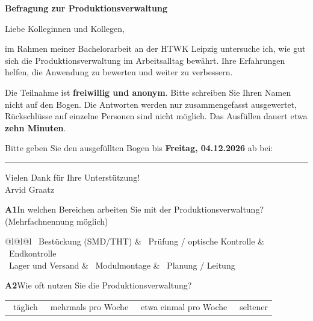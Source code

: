 \documentclass[11pt,a4paper]{article}
\newcommand{\kasten}{\raisebox{-0.2ex}{\scalebox{1.5}{$\square$}}}
\newcommand{\teil}[1]{\par\vspace{0.5em}{\large\bfseries #1}\par}
\begin{document}
{\LARGE\bfseries Befragung zur Produktionsverwaltung}

\vspace{0.3em}
Liebe Kolleginnen und Kollegen,

im Rahmen meiner Bachelorarbeit an der HTWK Leipzig untersuche ich, wie gut sich die
Produktionsverwaltung im Arbeitsalltag bewährt. Ihre Erfahrungen helfen, die Anwendung zu
bewerten und weiter zu verbessern.

Die Teilnahme ist \textbf{freiwillig und anonym}. Bitte schreiben Sie Ihren Namen nicht auf den
Bogen. Die Antworten werden nur zusammengefasst ausgewertet, Rückschlüsse auf einzelne Personen
sind nicht möglich. Das Ausfüllen dauert etwa \textbf{zehn Minuten}.

Bitte geben Sie den ausgefüllten Bogen bis \textbf{Freitag, 04.12.2026} ab bei:
\rule{5.2cm}{0.4pt}

Vielen Dank für Ihre Unterstützung!\\
Arvid Graatz

\teil{Teil A: Ihre Tätigkeit}

\textbf{A1}\enspace In welchen Bereichen arbeiten Sie mit der Produktionsverwaltung?
(Mehrfachnennung möglich)

\begin{tabular}{@{\hspace{1.8em}}l@{\hspace{2em}}l@{\hspace{2em}}l}
	\kasten\ Bestückung (SMD/THT) & \kasten\ Prüfung / optische Kontrolle & \kasten\ Endkontrolle \\[0.35em]
	\kasten\ Lager und Versand    & \kasten\ Modulmontage                 & \kasten\ Planung / Leitung \\[0.35em]
	\multicolumn{3}{@{\hspace{1.8em}}l}{\kasten\ Sonstiges: \rule{6cm}{0.4pt}}
\end{tabular}

\textbf{A2}\enspace Wie oft nutzen Sie die Produktionsverwaltung?

\begin{tabular}{@{\hspace{1.8em}}l@{\hspace{2em}}l@{\hspace{2em}}l@{\hspace{2em}}l}
	\kasten\ täglich & \kasten\ mehrmals pro Woche & \kasten\ etwa einmal pro Woche & \kasten\ seltener
\end{tabular}
\end{document}
